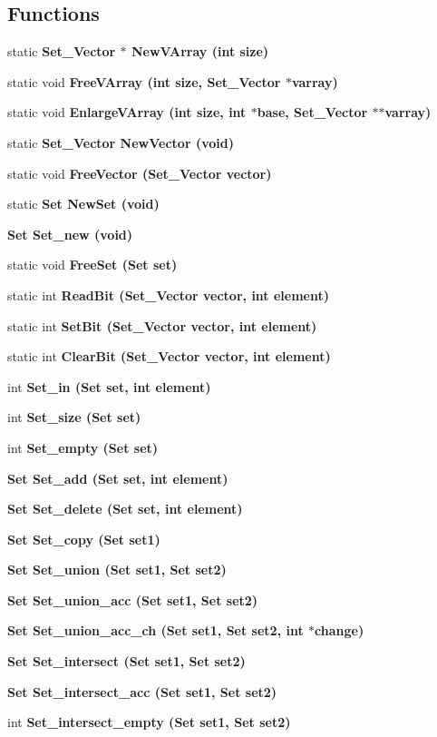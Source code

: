 \subsection*{Functions}
\begin{CompactItemize}
\item 
static \bf{Set\_\-Vector} $\ast$ \bf{New\-VArray} (int size)
\item 
static void \bf{Free\-VArray} (int size, \bf{Set\_\-Vector} $\ast$varray)
\item 
static void \bf{Enlarge\-VArray} (int size, int $\ast$base, \bf{Set\_\-Vector} $\ast$$\ast$varray)
\item 
static \bf{Set\_\-Vector} \bf{New\-Vector} (void)
\item 
static void \bf{Free\-Vector} (\bf{Set\_\-Vector} vector)
\item 
static \bf{Set} \bf{New\-Set} (void)
\item 
\bf{Set} \bf{Set\_\-new} (void)
\item 
static void \bf{Free\-Set} (\bf{Set} set)
\item 
static int \bf{Read\-Bit} (\bf{Set\_\-Vector} vector, int element)
\item 
static int \bf{Set\-Bit} (\bf{Set\_\-Vector} vector, int element)
\item 
static int \bf{Clear\-Bit} (\bf{Set\_\-Vector} vector, int element)
\item 
int \bf{Set\_\-in} (\bf{Set} set, int element)
\item 
int \bf{Set\_\-size} (\bf{Set} set)
\item 
int \bf{Set\_\-empty} (\bf{Set} set)
\item 
\bf{Set} \bf{Set\_\-add} (\bf{Set} set, int element)
\item 
\bf{Set} \bf{Set\_\-delete} (\bf{Set} set, int element)
\item 
\bf{Set} \bf{Set\_\-copy} (\bf{Set} set1)
\item 
\bf{Set} \bf{Set\_\-union} (\bf{Set} set1, \bf{Set} set2)
\item 
\bf{Set} \bf{Set\_\-union\_\-acc} (\bf{Set} set1, \bf{Set} set2)
\item 
\bf{Set} \bf{Set\_\-union\_\-acc\_\-ch} (\bf{Set} set1, \bf{Set} set2, int $\ast$change)
\item 
\bf{Set} \bf{Set\_\-intersect} (\bf{Set} set1, \bf{Set} set2)
\item 
\bf{Set} \bf{Set\_\-intersect\_\-acc} (\bf{Set} set1, \bf{Set} set2)
\item 
int \bf{Set\_\-intersect\_\-empty} (\bf{Set} set1, \bf{Set} set2)
$$
\end{CompactItemize}
